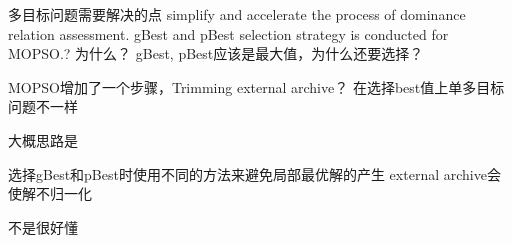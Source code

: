 \documentclass[
10pt, %
a4paper, %
onecolumn, %
portrait %
]{article}
\begin{document}
\begin{CJK*}{UTF8}{gbsn}
多目标问题需要解决的点
simplify  and  accelerate  the  process  of  dominance  relation  assessment.
 gBest  and  pBest  selection  strategy  is  conducted  for  MOPSO.? 为什么？ gBest, pBest应该是最大值，为什么还要选择？

MOPSO增加了一个步骤，Trimming external archive？
在选择best值上单多目标问题不一样

大概思路是

选择gBest和pBest时使用不同的方法来避免局部最优解的产生
external archive会使解不归一化

不是很好懂




\renewcommand{\refname}{Reference} %


\end{CJK*}
\end{document}
